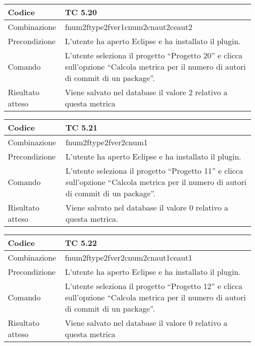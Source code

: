 \begin{table}[ht]
\begin{tabular}{|p{3cm}|p{9cm}|}
\hline
\cellcolor{lightgray}Codice				& TC 5.20								\\
\hline
\cellcolor{lightgray}Combinazione		& fnum2ftype2fver1cnum2cnaut2ceaut2 									\\
\hline
\cellcolor{lightgray}Precondizione		& L'utente ha aperto Eclipse e ha installato il plugin.									\\
\hline
\cellcolor{lightgray}Comando			& L'utente seleziona il progetto ``Progetto 20''  e clicca sull'opzione ``Calcola metrica per il numero di autori di commit di un package''.	\\
\hline
\cellcolor{lightgray}Risultato atteso	& Viene salvato nel database il valore 2 relativo a questa metrica	\\
\hline
\end{tabular}
\end{table}

\begin{table}[ht]
\begin{tabular}{|p{3cm}|p{9cm}|}
\hline
\cellcolor{lightgray}Codice				& TC 5.21								\\
\hline
\cellcolor{lightgray}Combinazione		& fnum2ftype2fver2cnum1									\\
\hline
\cellcolor{lightgray}Precondizione		& L'utente ha aperto Eclipse e ha installato il plugin.		\\
\hline
\cellcolor{lightgray}Comando			& L'utente seleziona il progetto ``Progetto 11''  e clicca sull'opzione ``Calcola metrica per il numero di autori di commit di un package''.	\\
\hline
\cellcolor{lightgray}Risultato atteso	& Viene salvato nel database il valore 0 relativo a questa metrica.\\
\hline
\end{tabular}
\end{table}

\begin{table}[ht]
\begin{tabular}{|p{3cm}|p{9cm}|}
\hline
\cellcolor{lightgray}Codice				& TC 5.22								\\
\hline
\cellcolor{lightgray}Combinazione		& fnum2ftype2fver2cnum2cnaut1ceaut1 									\\
\hline
\cellcolor{lightgray}Precondizione		& L'utente ha aperto Eclipse e ha installato il plugin.				\\
\hline
\cellcolor{lightgray}Comando			& L'utente seleziona il progetto ``Progetto 12''  e clicca sull'opzione ``Calcola metrica per il numero di autori di commit di un package''.	\\
\hline
\cellcolor{lightgray}Risultato atteso	& Viene salvato nel database il valore 0 relativo a questa metrica	\\
\hline
\end{tabular}
\end{table}

